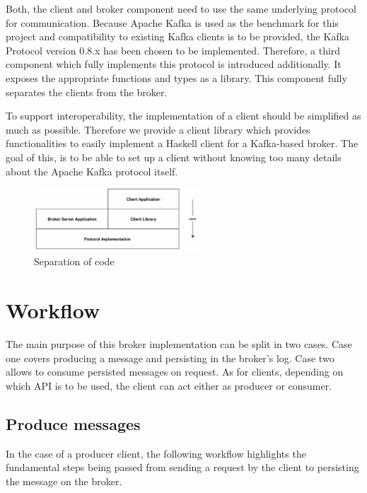 Both, the client and broker component need to use the same underlying protocol
for communication. Because Apache Kafka is used as the benchmark for this project
and compatibility to existing Kafka clients is to be provided, the Kafka
Protocol version 0.8.x has been chosen to be implemented. Therefore, a third
component which fully implements this protocol is introduced additionally. It
exposes the appropriate functions and types as a library. This component fully
separates the clients from the broker. 

To support interoperability, the implementation of a client should be simplified
as much as possible. Therefore we provide a client library which provides functionalities to
easily implement a Haskell client for a Kafka-based broker. The goal of this, is to be able to
set up a client without knowing too many details about the Apache Kafka protocol
itself.

\begin{figure}[H]
    \centering
    \includegraphics[width=0.55\textwidth]{images/architecture-components.png}
    \caption{Separation of code}
    \label{fig:architecture-components.png}
\end{figure}

\section{Workflow}

The main purpose of this broker implementation can be split in two cases. Case
one covers producing a message and persisting in the broker's log. Case two
allows to consume persisted messages on request. As for clients, depending on
which API is to be used, the client can act either as producer or consumer.

\subsection{Produce messages}

In the case of a producer client, the following workflow highlights the
fundamental steps being passed from sending a request by the client to
persisting the message on the broker.

